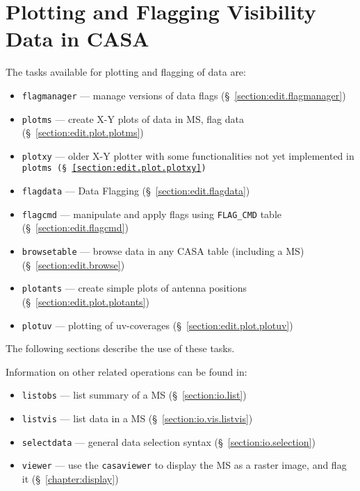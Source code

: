 \section{Plotting and Flagging Visibility Data in CASA}
\label{section:edit.intro}

The tasks available for plotting and flagging of data are:
\begin{itemize}
   \item {\tt flagmanager} --- manage versions of data flags
      (\S~\ref{section:edit.flagmanager})
   \item {\tt plotms} --- create X-Y plots of data in MS, flag data
      (\S~\ref{section:edit.plot.plotms})
   \item {\tt plotxy} --- older X-Y plotter with some functionalities not yet implemented in \tt{plotms}
      (\S~\ref{section:edit.plot.plotxy})
    \item {\tt flagdata} --- Data Flagging 
      (\S~\ref{section:edit.flagdata})
   \item {\tt flagcmd} --- manipulate and apply flags using {\tt FLAG\_CMD} table
      (\S~\ref{section:edit.flagcmd})
  \item {\tt browsetable} --- browse data in any CASA table (including a MS)
      (\S~\ref{section:edit.browse})
   \item {\tt plotants} --- create simple plots of antenna positions
      (\S~\ref{section:edit.plot.plotants})
  \item {\tt plotuv} --- plotting of uv-coverages
      (\S~\ref{section:edit.plot.plotuv})
\end{itemize}

The following sections describe the use of these tasks.

Information on other related operations can be found in:
\begin{itemize}
   \item {\tt listobs} --- list summary of a MS (\S~\ref{section:io.list})
   \item {\tt listvis} --- list data in a MS (\S~\ref{section:io.vis.listvis})
   \item {\tt selectdata} --- general data selection syntax
      (\S~\ref{section:io.selection})
   \item {\tt viewer} --- use the {\tt casaviewer} to display the MS as a 
      raster image, and flag it (\S~\ref{chapter:display})

\end{itemize}

